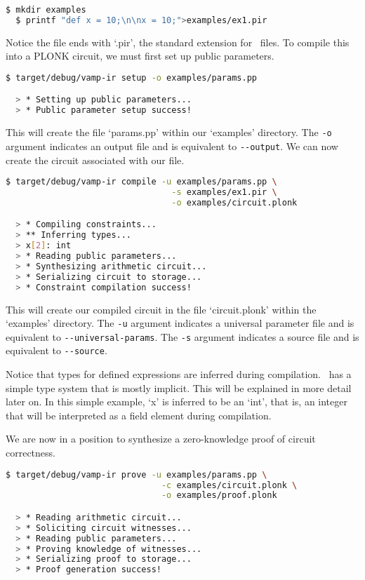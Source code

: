 \begin{lstlisting}[language=bash]
  $ mkdir examples
  $ printf "def x = 10;\n\nx = 10;">examples/ex1.pir
\end{lstlisting}

Notice the file ends with `.pir', the standard extension for \vampir\ files. To compile this into a PLONK circuit, we must first set up public parameters.

\begin{lstlisting}[language=bash]
  $ target/debug/vamp-ir setup -o examples/params.pp

  > * Setting up public parameters...
  > * Public parameter setup success!
\end{lstlisting}

This will create the file `params.pp' within our `examples' directory. The \lstinline{-o} argument indicates an output file and is equivalent to \lstinline{--output}. We can now create the circuit associated with our file.


\begin{lstlisting}[language=bash]
  $ target/debug/vamp-ir compile -u examples/params.pp \
                                 -s examples/ex1.pir \
                                 -o examples/circuit.plonk

  > * Compiling constraints...
  > ** Inferring types...
  > x[2]: int
  > * Reading public parameters...
  > * Synthesizing arithmetic circuit...
  > * Serializing circuit to storage...
  > * Constraint compilation success!
\end{lstlisting}

This will create our compiled circuit in the file `circuit.plonk' within the `examples' directory. The \lstinline{-u} argument indicates a universal parameter file and is equivalent to \lstinline{--universal-params}. The \lstinline{-s} argument indicates a source file and is equivalent to \lstinline{--source}.

Notice that types for defined expressions are inferred during compilation. \vampir\ has a simple type system that is mostly implicit. This will be explained in more detail later on. In this simple example, `x' is inferred to be an `int', that is, an integer that will be interpreted as a field element during compilation.

We are now in a position to synthesize a zero-knowledge proof of circuit correctness.

\begin{lstlisting}[language=bash]
  $ target/debug/vamp-ir prove -u examples/params.pp \
                               -c examples/circuit.plonk \
                               -o examples/proof.plonk

  > * Reading arithmetic circuit...
  > * Soliciting circuit witnesses...
  > * Reading public parameters...
  > * Proving knowledge of witnesses...
  > * Serializing proof to storage...
  > * Proof generation success!
\end{lstlisting}

